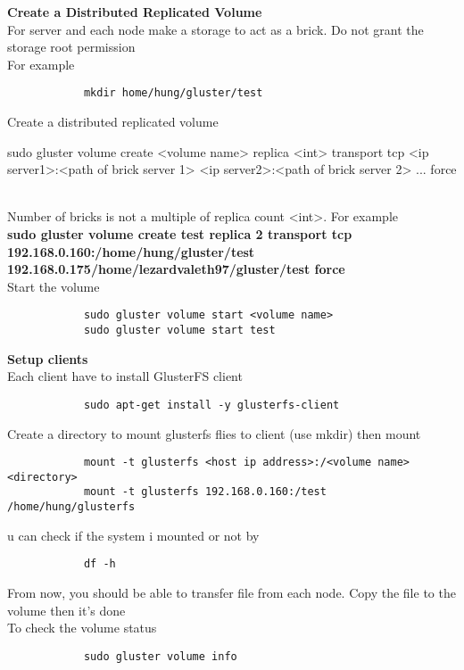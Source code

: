 \documentclass[12pt]{article}
\begin{document}
    \textbf{\large Create a Distributed Replicated Volume}\\
        For server and each node make a storage to act as a brick. Do not grant the storage root permission\\
        For example
        \begin{verbatim}
            mkdir home/hung/gluster/test
        \end{verbatim}
        Create a distributed replicated volume
        \begin{spverbatim}
           sudo gluster volume create <volume name> replica <int> transport tcp <ip server1>:<path of brick server 1> <ip server2>:<path of brick server 2> ... force
        \end{spverbatim}
        \\Number of bricks is not a multiple of replica count <int>. For example\\
         \textbf{\small sudo gluster volume create test replica 2 transport tcp 
         192.168.0.160:/home/hung/gluster/test 192.168.0.175/home/lezardvaleth97/gluster/test force}
        \\Start the volume
        \begin{verbatim}
            sudo gluster volume start <volume name>
            sudo gluster volume start test
        \end{verbatim}
        \textbf{Setup clients}\\
        Each client have to install GlusterFS client
        \begin{verbatim}
            sudo apt-get install -y glusterfs-client
        \end{verbatim}
        Create a directory to mount glusterfs flies to client (use mkdir) then mount
        \begin{verbatim}
            mount -t glusterfs <host ip address>:/<volume name> <directory>
            mount -t glusterfs 192.168.0.160:/test /home/hung/glusterfs
        \end{verbatim}
        u can check if the system i mounted or not by
        \begin{verbatim}
            df -h
        \end{verbatim}
        From now, you should be able to transfer file from each node. Copy the file to the volume then it's done\\
        To check the volume status
        \begin{verbatim}
            sudo gluster volume info
        \end{verbatim}
 
\end{document}
